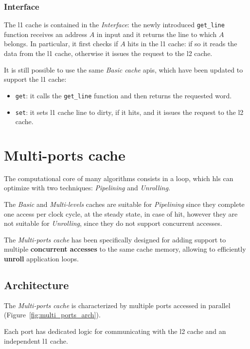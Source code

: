 \documentclass[11pt,a4paper,oneside]{memoir}
\begin{document}
\subsubsection{Interface}
The \ac{l1} cache is contained in the \emph{Interface}: the newly introduced
\texttt{get\_line} function receives an address $A$ in input and it returns the
line to which $A$ belongs.
In particular, it first checks if $A$ hits in the \ac{l1} cache: if so it reads
the data from the \ac{l1} cache, otherwise it issues the request to the \ac{l2}
cache.

\bigskip
It is still possible to use the same \emph{Basic cache} \acp{api}, which have
been updated to support the \ac{l1} cache:
\begin{itemize}
	\item \texttt{get}: it calls the \texttt{get\_line} function and then
		returns the requested word.
	\item \texttt{set}: it sets \ac{l1} cache line to dirty, if it hits, and
		it issues the request to the \ac{l2} cache.
\end{itemize}

\clearpage

\section{Multi-ports cache}
The computational core of many algorithms consists in a loop, which \ac{hls} can
optimize with two techniques: \emph{Pipelining} and \emph{Unrolling}.

The \emph{Basic} and \emph{Multi-levels} caches are suitable for
\emph{Pipelining} since they complete one access per clock cycle, at the steady
state, in case of hit, however they are not suitable for \emph{Unrolling}, since
they do not support concurrent accesses.

\bigskip
The \emph{Multi-ports cache} has been specifically designed for adding support
to multiple \textbf{concurrent accesses} to the same cache memory, allowing to
efficiently \textbf{unroll} application loops.

\subsection{Architecture}
The \emph{Multi-ports cache} is characterized by multiple ports accessed in
parallel (Figure~\ref{fig:multi_ports_arch}).

Each port has dedicated logic for communicating with the \ac{l2} cache and an
independent \ac{l1} cache.
\end{document}
